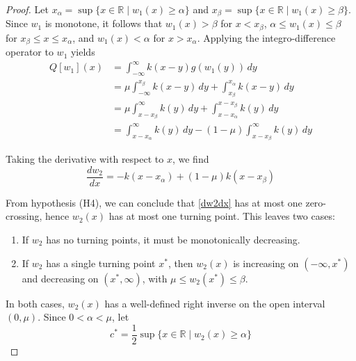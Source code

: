 \documentclass[11pt]{article}
\theoremstyle{definition}
\numberwithin{equation}{section}
\numberwithin{thm}{section}
\renewcommand{\a}{\alpha}
\renewcommand{\b}{\beta}
\newcommand{\m}{\mu}
\begin{document}
\begin{proof} Let $x_\a=\sup\{x\in\mathbb R\mid w_1(x)\geq\a\}$ and $x_\b=\sup\{x\in\mathbb R\mid w_1(x)\geq\b\}$. Since $w_1$ is monotone, it follows that $w_1(x)>\b$ for $x<x_\b$, $\a\leq w_1(x)\leq\b$ for $x_\b\leq x\leq x_\a$, and $w_1(x)<\a$ for $x>x_\a$. Applying the integro-difference operator to $w_1$ yields
\begin{equation} \label{qw1calculation}
\begin{aligned}
Q[w_1](x) &= \int_{-\infty}^{\infty} k(x-y) g(w_1(y)) \, dy \\
&= \m \int_{-\infty}^{x_\b} k(x-y) \, dy + \int_{x_\b}^{x_\a} k(x-y) \, dy \\
&= \m \int_{x-x_\b}^{\infty} k(y) \, dy + \int_{x-x_\a}^{x-x_\b} k(y) \, dy \\
&= \int_{x-x_\a}^{\infty} k(y) \, dy - (1-\m) \int_{x-x_\b}^{\infty} k(y) \, dy
\end{aligned} \end{equation}

Taking the derivative with respect to $x$, we find
\begin{equation}\label{dw2dx}
\frac{dw_2}{dx} = -k(x-x_\a) + (1-\m)k(x-x_\b)
\end{equation}

From hypothesis (H4), we can conclude that \eqref{dw2dx} has at most one zero-crossing, hence $w_2(x)$ has at most one turning point. This leaves two cases:
\begin{enumerate}[{Case} 1.]
\item If $w_2$ has no turning points, it must be monotonically decreasing.
\item If $w_2$ has a single turning point $x^*$, then $w_2(x)$ is increasing on $(-\infty,x^*)$ and decreasing on $(x^*,\infty)$, with $\m \leq w_2(x^*)\leq \b$.
\end{enumerate}

In both cases, $w_2(x)$ has a well-defined right inverse on the open interval $(0,\m)$. Since $0<\a<\m$, let
\begin{equation}
c^*=\frac{1}{2}\sup\{x\in\mathbb R\mid w_2(x)\geq\a\}
\end{equation}


\end{proof}
\end{document}
